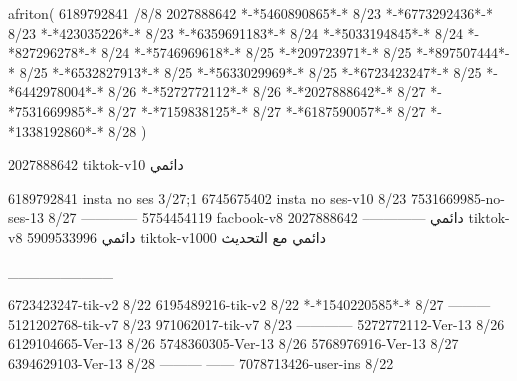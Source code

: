 afriton(
6189792841 /8/8
2027888642
*-*5460890865*-* 8/23
*-*6773292436*-* 8/23
*-*423035226*-* 8/23
*-*6359691183*-* 8/24
*-*5033194845*-* 8/24
*-*827296278*-* 8/24
*-*5746969618*-* 8/25
*-*209723971*-* 8/25
*-*897507444*-* 8/25
*-*6532827913*-* 8/25
*-*5633029969*-* 8/25
*-*6723423247*-* 8/25
*-*6442978004*-* 8/26
*-*5272772112*-* 8/26
*-*2027888642*-* 8/27
*-*7531669985*-* 8/27
*-*7159838125*-* 8/27
*-*6187590057*-* 8/27
*-*1338192860*-* 8/28
)

2027888642 tiktok-v10
دائمي

6189792841 insta no ses
3/27;1
6745675402 insta no ses-v10
8/23
7531669985-no-ses-13
8/27
------------
5754454119 facbook-v8
دائمي
--------------
2027888642 tiktok-v8
دائمي
5909533996 tiktok-v1000
دائمي مع التحديث

__________

6723423247-tik-v2
8/22
6195489216-tik-v2
8/22
*-*1540220585*-* 8/27
---------
5121202768-tik-v7
8/23
971062017-tik-v7
8/23
------------
5272772112-Ver-13
8/26
6129104665-Ver-13
8/26
5748360305-Ver-13
8/26
5768976916-Ver-13
8/27
6394629103-Ver-13
8/28
---------
------
7078713426-user-ins
8/22
